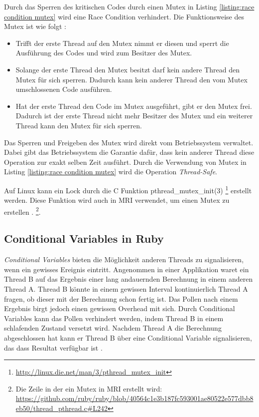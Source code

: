 Durch das Sperren des kritischen Codes durch einen Mutex in Listing \ref{listing:race condition mutex} wird eine Race Condition verhindert. Die Funktionsweise des Mutex ist wie folgt \cite[p. 83-84]{Sto2013}: 

\begin{itemize}
  \item Trifft der erste Thread auf den Mutex nimmt er diesen und sperrt die Ausführung des Codes und wird zum Besitzer des Mutex.
  \item Solange der erste Thread den Mutex besitzt darf kein andere Thread den Mutex für sich sperren. Dadurch kann kein anderer Thread den vom Mutex umschlossenen Code ausführen. 
  \item Hat der erste Thread den Code im Mutex ausgeführt, gibt er den Mutex frei. Dadurch ist der erste Thread nicht mehr Besitzer des Mutex und ein weiterer Thread kann den Mutex für sich sperren.
\end{itemize}

Das Sperren und Freigeben des Mutex wird direkt vom Betriebssystem verwaltet. Dabei gibt das Betriebssystem die Garantie dafür, dass kein anderer Thread diese Operation zur exakt selben Zeit ausführt. Durch die Verwendung von Mutex in Listing \ref{listing:race condition mutex} wird die Operation \emph{Thread-Safe}.

Auf Linux kann ein Lock durch die C Funktion pthread\_mutex\_init(3) \footnote{\url{http://linux.die.net/man/3/pthread_mutex_init}} erstellt werden. Diese Funktion wird auch in MRI verwendet, um einen Mutex zu erstellen \cite[p. 83-84]{Sto2013}. \footnote{Die Zeile in der ein Mutex in MRI erstellt wird: \url{https://github.com/ruby/ruby/blob/40564c1e3b187fc593001ae80522e577dbb8eb50/thread_pthread.c#L242}}.

\subsection{Conditional Variables in Ruby}

\emph{Conditional Variables} bieten die Möglichkeit anderen Threads zu signalisieren, wenn ein gewisses Ereignis eintritt. Angenommen in einer Applikation waret ein Thread B auf das Ergebnis einer lang andauernden Berechnung in einem anderen Thread A. Thread B könnte in einem gewissen Interval kontinuierlich Thread A fragen, ob dieser mit der Berechnung schon fertig ist. Das Pollen nach einem Ergebnis birgt jedoch einen gewissen Overhead mit sich. Durch Conditional Variables kann das Pollen verhindert werden, indem Thread B in einem schlafenden Zustand versetzt wird. Nachdem Thread A die Berechnung abgeschlossen hat kann er Thread B über eine Conditional Variable signalisieren, das dass Resultat verfügbar ist \cite[p. 748]{tan09} \cite[p. 100]{Sto2013}. 

